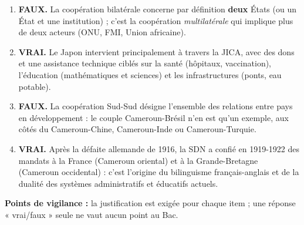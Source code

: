 \documentclass[11pt]{article}
\newcommand{\cle}[1]{{\popxbold\color{popdark}#1}}
\begin{document}
\begin{corrige}
\begin{enumerate}
\item \textbf{FAUX.} La coopération \cle{bilatérale} concerne par définition \textbf{deux} États (ou un État et une institution) ; c'est la coopération \emph{multilatérale} qui implique plus de deux acteurs (ONU, FMI, Union africaine).
\item \textbf{VRAI.} Le Japon intervient principalement à travers la \cle{JICA}, avec des dons et une assistance technique ciblés sur la santé (hôpitaux, vaccination), l'éducation (mathématiques et sciences) et les infrastructures (ponts, eau potable).
\item \textbf{FAUX.} La coopération \cle{Sud-Sud} désigne l'ensemble des relations entre pays en développement : le couple Cameroun-Brésil n'en est qu'un exemple, aux côtés du Cameroun-Chine, Cameroun-Inde ou Cameroun-Turquie.
\item \textbf{VRAI.} Après la défaite allemande de 1916, la SDN a confié en 1919-1922 des \cle{mandats} à la France (Cameroun oriental) et à la Grande-Bretagne (Cameroun occidental) : c'est l'origine du bilinguisme français-anglais et de la dualité des systèmes administratifs et éducatifs actuels.
\end{enumerate}
\textbf{Points de vigilance :} la justification est exigée pour chaque item ; une réponse « vrai/faux » seule ne vaut aucun point au Bac.
\end{corrige}
\end{document}

